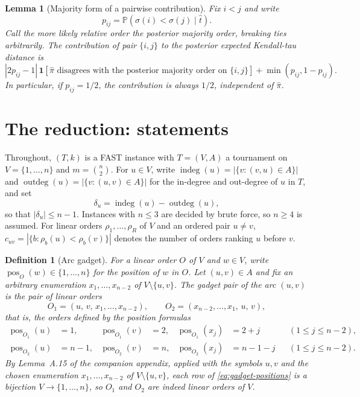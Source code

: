 \documentclass[11pt]{article}
\newtheorem{definition}{Definition}
\newtheorem{lemma}{Lemma}
\newcommand{\Prb}{\mathbb{P}}
\newcommand{\ind}{\mathbf{1}}
\newcommand{\indeg}{\operatorname{indeg}}
\newcommand{\pos}{\operatorname{pos}}
\newcommand{\outdeg}{\operatorname{outdeg}}
\begin{document}
\begin{lemma}[Majority form of a pairwise contribution]\label{lem:majority}
Fix $i<j$ and write
\begin{equation}
  p_{ij}=\Prb(\sigma(i)<\sigma(j)\mid \hat t).
\end{equation}
Call the more likely relative order the posterior majority order, breaking ties arbitrarily.  The contribution of pair $\{i,j\}$ to the posterior expected Kendall-tau distance is
\begin{equation}
  |2p_{ij}-1|\,\ind[\hat\pi\text{ disagrees with the posterior majority order on }\{i,j\}]
  +\min(p_{ij},1-p_{ij}).
\end{equation}
In particular, if $p_{ij}=1/2$, the contribution is always $1/2$, independent of $\hat\pi$.
\end{lemma}

\section{The reduction: statements}

Throughout, $(T,k)$ is a FAST instance with $T=(V,A)$ a tournament on $V=\{1,\ldots,n\}$ and $m=\binom n2$.  For $u\in V$, write $\indeg(u)=|\{v:(v,u)\in A\}|$ and $\outdeg(u)=|\{v:(u,v)\in A\}|$ for the in-degree and out-degree of $u$ in $T$, and set
\begin{equation}
  \delta_u=\indeg(u)-\outdeg(u),
\end{equation}
so that $|\delta_u|\le n-1$.  Instances with $n\le 3$ are decided by brute force, so $n\ge 4$ is assumed.  For linear orders $\rho_1,\ldots,\rho_R$ of $V$ and an ordered pair $u\ne v$, $c_{uv}=|\{b:\rho_b(u)<\rho_b(v)\}|$ denotes the number of orders ranking $u$ before $v$.

\begin{definition}[Arc gadget]\label{def:gadget}
For a linear order $O$ of $V$ and $w\in V$, write $\pos_O(w)\in\{1,\ldots,n\}$ for the position of $w$ in $O$.  Let $(u,v)\in A$ and fix an arbitrary enumeration $x_1,\ldots,x_{n-2}$ of $V\setminus\{u,v\}$.  The \emph{gadget pair} of the arc $(u,v)$ is the pair of linear orders
\begin{equation}
  O_1=(u,\,v,\,x_1,\ldots,x_{n-2}),\qquad
  O_2=(x_{n-2},\ldots,x_1,\,u,\,v),
\end{equation}
that is, the orders defined by the position formulas
\begin{equation}\label{eq:gadget-positions}
\begin{aligned}
  \pos_{O_1}(u)&=1, & \pos_{O_1}(v)&=2, & \pos_{O_1}(x_j)&=2+j &&(1\le j\le n-2),\\
  \pos_{O_2}(u)&=n-1, & \pos_{O_2}(v)&=n, & \pos_{O_2}(x_j)&=n-1-j &&(1\le j\le n-2).
\end{aligned}
\end{equation}
By Lemma~A.15 of the companion appendix, applied with the symbols $u,v$ and the chosen enumeration $x_1,\ldots,x_{n-2}$ of $V\setminus\{u,v\}$, each row of \eqref{eq:gadget-positions} is a bijection $V\to\{1,\ldots,n\}$, so $O_1$ and $O_2$ are indeed linear orders of $V$.
\end{definition}
\end{document}

